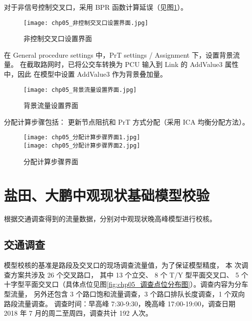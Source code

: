 对于非信号控制交叉口，采用 BPR 函数计算延误（见图\ref{fig:chp05_非控制交叉口设置界面}）。

\clearpage

\begin{figure}[!ht]
  \centering
  \texttt{[image: chp05\_非控制交叉口设置界面.jpg]}
  \caption{非控制交叉口设置界面\label{fig:chp05_非控制交叉口设置界面} }
\end{figure}
 

在 General procedure settings 中，PrT settings / Assignment 下，设置背景流量。
在截取路网时，已将公交车转换为 PCU 输入到 Link 的 AddValue3 属性中，因此
在模型中设置 AddValue3 作为背景叠加量。

\begin{figure}[!ht]
  \centering
  \texttt{[image: chp05\_背景流量设置界面.jpg]}
  \caption{背景流量设置界面\label{fig:chp05_背景流量设置界面} }
\end{figure}

\clearpage


分配计算步骤包括： 更新节点阻抗和 PrT 方式分配（采用 ICA 均衡分配方法）。

\begin{figure}[!ht]
  \centering
  \texttt{[image: chp05\_分配计算步骤界面1.jpg]} \\\vspace{10pt}
  \texttt{[image: chp05\_分配计算步骤界面2.jpg]}
  \caption{分配计算步骤界面\label{fig:chp05_分配计算步骤}}   
\end{figure}

\section{盐田、大鹏中观现状基础模型校验}
根据交通调查得到的流量数据，分别对中观现状晚高峰模型进行校核。

\subsection{交通调查}
模型校核的基准是路段及交叉口的现场调查流量值，为了保证模型精度， 本
次调查方案共涉及 26 个交叉路口， 其中 13 个立交、 8 个 T/Y 型平面交叉口、 5
个十字型平面交叉口（具体点位见图\ref{fig:chp05_调查点位分布图}）。调查内容为分车型流量，
另外还包含 3 个路口饱和流量调查，3 个路口排队长度调查，1 个双向路段流量调查。
调查时间：早高峰 7:30-9:30，晚高峰 17:00-19:00，调查日期 2018 年 7 月的周二至周四，调查共计 192 人次。

